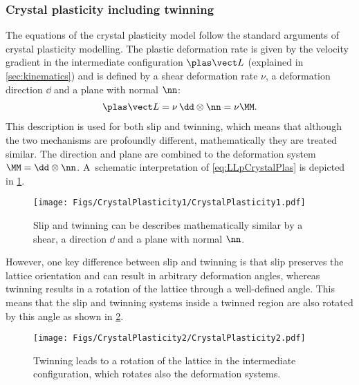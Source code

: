 \subsubsection{Crystal plasticity including twinning}
The equations of the crystal plasticity model follow the standard arguments of crystal plasticity modelling\supercite{roters_crystal_2010}. The plastic deformation rate is given by the velocity gradient in the intermediate configuration $\LLp$ (explained in \cref{sec:kinematics}) and is defined by a shear deformation rate $\nu$, a deformation direction $\dd$ and a plane with normal $\nn$:
\begin{align}
  \LLp = \nu \, \dd\otimes\nn = \nu\MM.
  \label{eq:LLpCrystalPlas}
\end{align}
This description is used for both slip and twinning, which means that although the two mechanisms are profoundly different, mathematically they are treated similar. The direction and plane are combined to the deformation system \mbox{$\MM=\dd\otimes\nn$}. A~schematic interpretation of \cref{eq:LLpCrystalPlas} is depicted in \cref{fig:CrystalPlasticity1}. \\
\begin{figure}[H]
  \centering
  \texttt{[image: Figs/CrystalPlasticity1/CrystalPlasticity1.pdf]}
  \caption{Slip and twinning can be describes mathematically similar by a shear, a direction $\dd$ and a plane with normal $\nn$.}
  \label{fig:CrystalPlasticity1}
\end{figure}

However, one key difference between slip and twinning is that slip preserves the lattice orientation and can result in arbitrary deformation angles, whereas twinning results in a rotation of the lattice through a well-defined angle. This means that the slip and twinning systems inside a twinned region are also rotated by this angle as shown in \cref{fig:CrystalPlasticity2}. \\
\begin{figure}[h!]
  \centering
  \texttt{[image: Figs/CrystalPlasticity2/CrystalPlasticity2.pdf]}
  \caption{Twinning leads to a rotation of the lattice in the intermediate configuration, which rotates also the deformation systems.}
  \label{fig:CrystalPlasticity2}
\end{figure}

